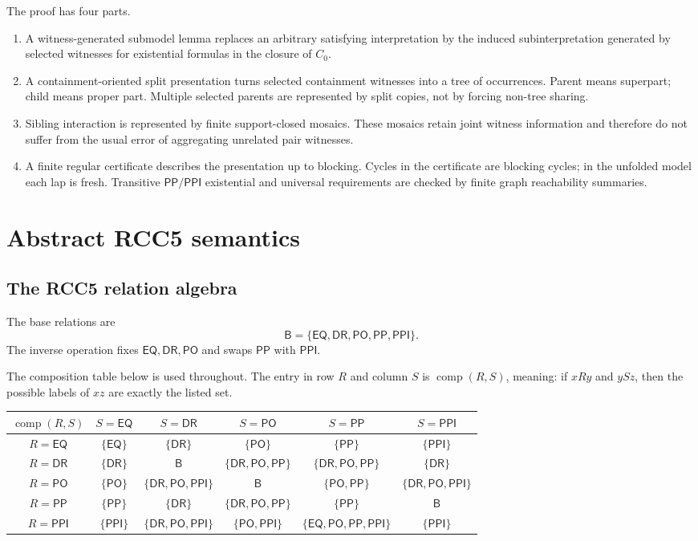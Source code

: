 \documentclass[11pt]{article}
\theoremstyle{remark}
\newcommand{\Base}{\mathsf{B}}
\newcommand{\DR}{\mathsf{DR}}
\newcommand{\PO}{\mathsf{PO}}
\newcommand{\PP}{\mathsf{PP}}
\newcommand{\PPI}{\mathsf{PPI}}
\newcommand{\EQ}{\mathsf{EQ}}
\newcommand{\comp}{\operatorname{comp}}
\begin{document}
The proof has four parts.
\begin{enumerate}
\item A witness-generated submodel lemma replaces an arbitrary satisfying interpretation by the induced subinterpretation generated by selected witnesses for existential formulas in the closure of $C_0$.
\item A containment-oriented split presentation turns selected containment witnesses into a tree of occurrences.  Parent means superpart; child means proper part.  Multiple selected parents are represented by split copies, not by forcing non-tree sharing.
\item Sibling interaction is represented by finite support-closed mosaics.  These mosaics retain joint witness information and therefore do not suffer from the usual error of aggregating unrelated pair witnesses.
\item A finite regular certificate describes the presentation up to blocking.  Cycles in the certificate are blocking cycles; in the unfolded model each lap is fresh.  Transitive $\PP/\PPI$ existential and universal requirements are checked by finite graph reachability summaries.
\end{enumerate}

\section{Abstract RCC5 semantics}
\subsection{The RCC5 relation algebra}
The base relations are
\[
\Base=\{\EQ,\DR,\PO,\PP,\PPI\}.
\]
The inverse operation fixes $\EQ,\DR,\PO$ and swaps $\PP$ with $\PPI$.

The composition table below is used throughout.  The entry in row $R$ and column $S$ is $\comp(R,S)$, meaning: if $xRy$ and $ySz$, then the possible labels of $xz$ are exactly the listed set.

\begin{center}
\renewcommand{\arraystretch}{1.18}
\begin{tabular}{c|ccccc}
\toprule
$\comp(R,S)$ & $S=\EQ$ & $S=\DR$ & $S=\PO$ & $S=\PP$ & $S=\PPI$ \\
\midrule
$R=\EQ$  & $\{\EQ\}$ & $\{\DR\}$ & $\{\PO\}$ & $\{\PP\}$ & $\{\PPI\}$ \\
$R=\DR$  & $\{\DR\}$ & $\Base$ & $\{\DR,\PO,\PP\}$ & $\{\DR,\PO,\PP\}$ & $\{\DR\}$ \\
$R=\PO$  & $\{\PO\}$ & $\{\DR,\PO,\PPI\}$ & $\Base$ & $\{\PO,\PP\}$ & $\{\DR,\PO,\PPI\}$ \\
$R=\PP$  & $\{\PP\}$ & $\{\DR\}$ & $\{\DR,\PO,\PP\}$ & $\{\PP\}$ & $\Base$ \\
$R=\PPI$ & $\{\PPI\}$ & $\{\DR,\PO,\PPI\}$ & $\{\PO,\PPI\}$ & $\{\EQ,\PO,\PP,\PPI\}$ & $\{\PPI\}$ \\
\bottomrule
\end{tabular}
\end{center}
\end{document}
